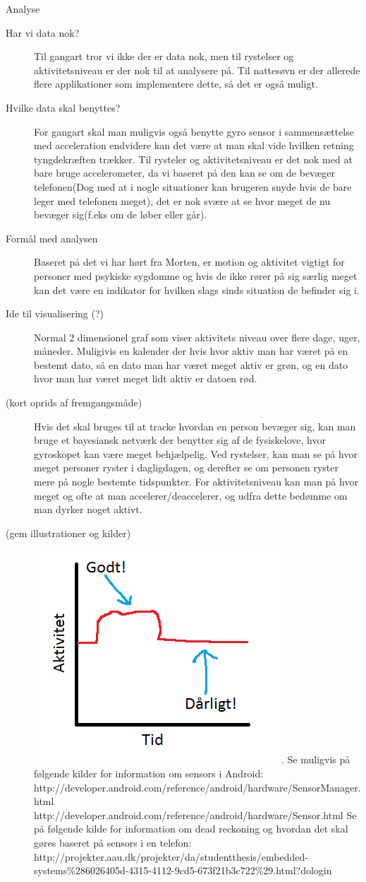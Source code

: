 Analyse
\begin{description}
\item[Har vi data nok?] Til gangart tror vi ikke der er data nok, men til rystelser og aktivitetsniveau er der nok til at analysere på. Til nattesøvn er der allerede flere applikationer som implementere dette, så det er også muligt.
\item[Hvilke data skal benyttes?] For gangart skal man muligvis også benytte gyro sensor i sammensættelse med acceleration endvidere kan det være at man skal vide hvilken retning tyngdekræften trækker. Til rysteler og aktivitetsniveau er det nok med at bare bruge accelerometer, da vi baseret på den kan se om de bevæger telefonen(Dog med at i nogle situationer kan brugeren snyde hvis de bare leger med telefonen meget), det er nok svære at se hvor meget de nu bevæger sig(f.eks om de løber eller går). 
\item[Formål med analysen] Baseret på det vi har hørt fra Morten, er motion og aktivitet vigtigt for personer med psykiske sygdomme og hvis de ikke rører på sig særlig meget kan det være en indikator for hvilken slags sinds situation de befinder sig i.
\item[Ide til visualisering (?)] Normal 2 dimensionel graf som viser aktivitets niveau over flere dage, uger, måneder. Muligivis en kalender der hvis hvor aktiv man har været på en bestemt dato, så en dato man har været meget aktiv er grøn, og en dato hvor man har været meget lidt aktiv er datoen rød.
\item[(kort oprids af fremgangsmåde)] Hvis det skal bruges til at tracke hvordan en person bevæger sig, kan man bruge et bayesiansk netværk der benytter sig af de fysiskelove, hvor gyroskopet kan være meget behjælpelig. Ved rystelser, kan man se på hvor meget personer ryster i dagligdagen, og derefter se om personen ryster mere på nogle bestemte tidspunkter. For aktivitetsniveau kan man på hvor meget og ofte at man accelerer/deaccelerer, og udfra dette bedømme om man dyrker noget aktivt.
\item[(gem illustrationer og kilder)] \includegraphics{graphics/aktivitet_billed}. Se muligvis på følgende kilder for information om sensors i Android: http://developer.android.com/reference/android/hardware/SensorManager.html http://developer.android.com/reference/android/hardware/Sensor.html 
Se på følgende kilde for information om dead reckoning og hvordan det skal gøres baseret på sensors i en telefon: http://projekter.aau.dk/projekter/da/studentthesis/embedded-systems\%286026405d-4315-4112-9cd5-673f21b3c722\%29.html?dologin 
\end{description}